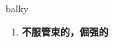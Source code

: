 
\begin{frame}
{\huge balky}
\begin{center}
\begin{enumerate}\Large
  \item \textbf{不服管束的，倔强的}
\end{enumerate}
\end{center}
\end{frame}
